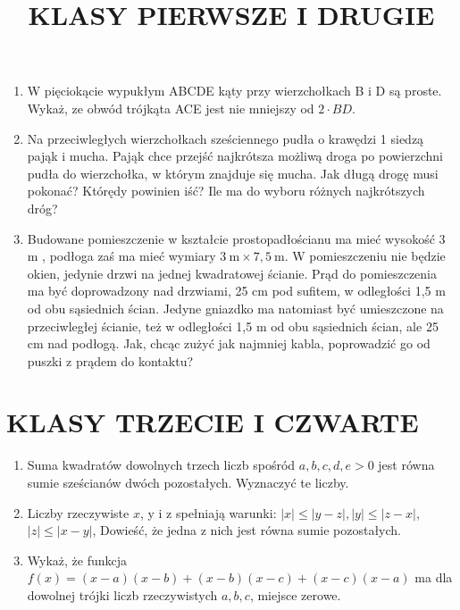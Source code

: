 \documentclass[10pt]{article}
\title{KLASY PIERWSZE I DRUGIE }
\author{}
\date{}
\begin{document}
\maketitle
\begin{enumerate}
  \item W pięciokącie wypukłym ABCDE kąty przy wierzchołkach B i D są proste. Wykaż, ze obwód trójkąta ACE jest nie mniejszy od \(2 \cdot B D\).
  \item Na przeciwległych wierzchołkach sześciennego pudła o krawędzi 1 siedzą pająk i mucha. Pająk chce przejść najkrótsza możliwą droga po powierzchni pudła do wierzchołka, w którym znajduje się mucha. Jak długą drogę musi pokonać? Którędy powinien iść? Ile ma do wyboru różnych najkrótszych dróg?
  \item Budowane pomieszczenie w kształcie prostopadłościanu ma mieć wysokość 3 m , podłoga zaś ma mieć wymiary \(3 \mathrm{~m} \times 7,5 \mathrm{~m}\). W pomieszczeniu nie będzie okien, jedynie drzwi na jednej kwadratowej ścianie. Prąd do pomieszczenia ma być doprowadzony nad drzwiami, 25 cm pod sufitem, w odległości 1,5 m od obu sąsiednich ścian. Jedyne gniazdko ma natomiast być umieszczone na przeciwległej ścianie, też w odległości 1,5 m od obu sąsiednich ścian, ale 25 cm nad podłogą. Jak, chcąc zużyć jak najmniej kabla, poprowadzić go od puszki z prądem do kontaktu?
\end{enumerate}

\section*{KLASY TRZECIE I CZWARTE}
\begin{enumerate}
  \item Suma kwadratów dowolnych trzech liczb spośród \(a, b, c, d, e>0\) jest równa sumie sześcianów dwóch pozostałych. Wyznaczyć te liczby.
  \item Liczby rzeczywiste \(x\), y i z spełniają warunki: \(|x| \leq|y-z|,|y| \leq|z-x|\), \(|z| \leq|x-y|\), Dowieść, że jedna z nich jest równa sumie pozostałych.
  \item Wykaż, że funkcja \(f(x)=(x-a)(x-b)+(x-b)(x-c)+(x-c)(x-a)\) ma dla dowolnej trójki liczb rzeczywistych \(a, b, c\), miejsce zerowe.
\end{enumerate}
\end{document}
